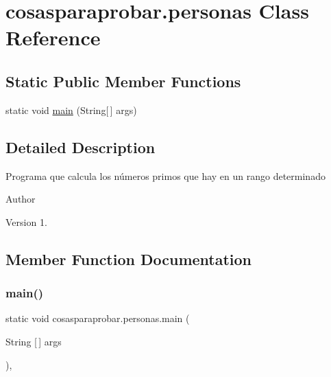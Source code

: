 \hypertarget{classcosasparaprobar_1_1personas}{}\section{cosasparaprobar.\+personas Class Reference}
\label{classcosasparaprobar_1_1personas}
\subsection*{Static Public Member Functions}
\begin{DoxyCompactItemize}
\item 
static void \mbox{\hyperlink{classcosasparaprobar_1_1personas_aefa0643078c9ade42af7cb543ee097c7}{main}} (String\mbox{[}$\,$\mbox{]} args)
\end{DoxyCompactItemize}


\subsection{Detailed Description}
Programa que calcula los números primos que hay en un rango determinado \begin{DoxyAuthor}{Author}

\end{DoxyAuthor}
\begin{DoxyVersion}{Version}
1. 
\end{DoxyVersion}


\subsection{Member Function Documentation}
\mbox{\label{classcosasparaprobar_1_1personas_aefa0643078c9ade42af7cb543ee097c7}} 
\subsubsection{\texorpdfstring{main()}{main()}}
{\footnotesize\ttfamily static void cosasparaprobar.\+personas.\+main (\begin{DoxyParamCaption}\item[{String \mbox{[}$\,$\mbox{]}}]{args }\end{DoxyParamCaption})\hspace{0.3cm}{\ttfamily [inline]}, {\ttfamily [static]}}

